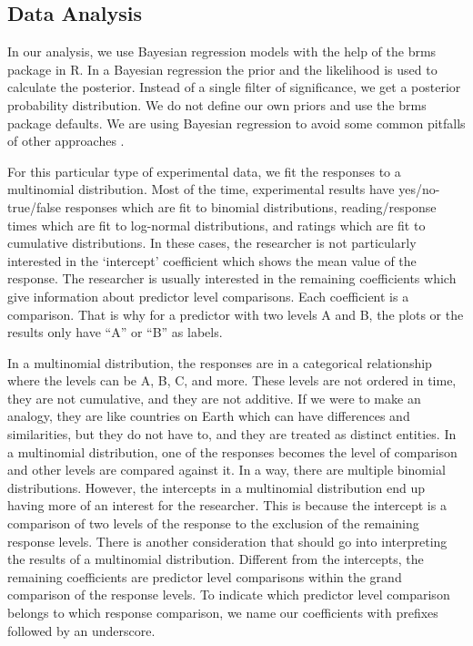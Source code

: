 \documentclass[review]{elsarticle} %
\begin{document}
\hypertarget{data-analysis}{%
\subsection{Data Analysis}\label{data-analysis}}

In our analysis, we use Bayesian regression models with the help of the
brms package \citep{burkner2018} in R. In a Bayesian regression the
prior and the likelihood is used to calculate the posterior. Instead of
a single filter of significance, we get a posterior probability
distribution. We do not define our own priors and use the brms package
defaults. We are using Bayesian regression to avoid some common pitfalls
of other approaches \citep{wagenmakers2007, kruschke2011}.

For this particular type of experimental data, we fit the responses to a
multinomial distribution. Most of the time, experimental results have
yes/no-true/false responses which are fit to binomial distributions,
reading/response times which are fit to log-normal distributions, and
ratings which are fit to cumulative distributions. In these cases, the
researcher is not particularly interested in the `intercept' coefficient
which shows the mean value of the response. The researcher is usually
interested in the remaining coefficients which give information about
predictor level comparisons. Each coefficient is a comparison. That is
why for a predictor with two levels A and B, the plots or the results
only have ``A'' or ``B'' as labels.

In a multinomial distribution, the responses are in a categorical
relationship where the levels can be A, B, C, and more. These levels are
not ordered in time, they are not cumulative, and they are not additive.
If we were to make an analogy, they are like countries on Earth which
can have differences and similarities, but they do not have to, and they
are treated as distinct entities. In a multinomial distribution, one of
the responses becomes the level of comparison and other levels are
compared against it. In a way, there are multiple binomial
distributions. However, the intercepts in a multinomial distribution end
up having more of an interest for the researcher. This is because the
intercept is a comparison of two levels of the response to the exclusion
of the remaining response levels. There is another consideration that
should go into interpreting the results of a multinomial distribution.
Different from the intercepts, the remaining coefficients are predictor
level comparisons within the grand comparison of the response levels. To
indicate which predictor level comparison belongs to which response
comparison, we name our coefficients with prefixes followed by an
underscore.
\end{document}
